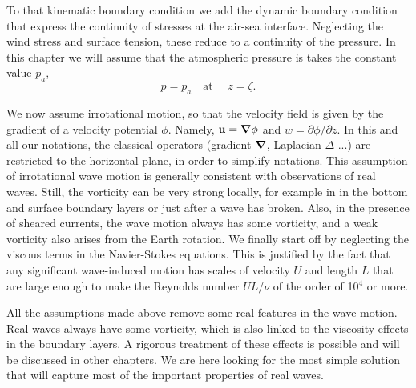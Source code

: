 To that kinematic boundary condition we add the dynamic boundary condition that express the continuity of 
stresses at the air-sea interface. Neglecting the wind stress and surface tension, these reduce to a continuity of 
the pressure. In this chapter we will assume that the atmospheric pressure is takes the constant value  $p_a$,
\begin{equation}
    p=p_a\quad \mbox{at\ }\quad z=\zeta.
\end{equation}

We now assume irrotational motion, so that the velocity field 
is given by the gradient of a velocity potential 
$\phi$. Namely, $ {\mathbf u} = \mbox{\boldmath $\nabla$} \phi$ and $w={\partial
\phi}/{\partial z}$. In this and all our notations, the classical operators  (gradient
$\mbox{\boldmath $\nabla$}$, Laplacian $\Delta$ ...) are restricted to the horizontal 
plane, in order to simplify notations. This assumption of irrotational wave motion
is generally consistent with observations of real waves. Still, the vorticity can be 
very strong locally, for example in in the bottom and surface boundary layers
or just after a wave has broken. Also, in the presence of sheared currents, the wave motion always has 
some vorticity, and a weak vorticity also arises from the Earth rotation. 
We finally start off by neglecting the viscous terms in the Navier-Stokes equations. This is justified by the 
fact that any significant 
wave-induced motion has scales of velocity $U$ and length $L$ that are large enough to 
make the Reynolds number $UL/\nu$ of the order of  10$^4$ or more.

All the assumptions made above remove some real features in the wave motion. 
Real waves always have some vorticity, which is also linked to the viscosity 
effects in the boundary layers. A rigorous treatment of these effects is possible 
and will be discussed in other chapters. We are here looking for the most 
simple solution that will capture most of the important properties of real waves. 


